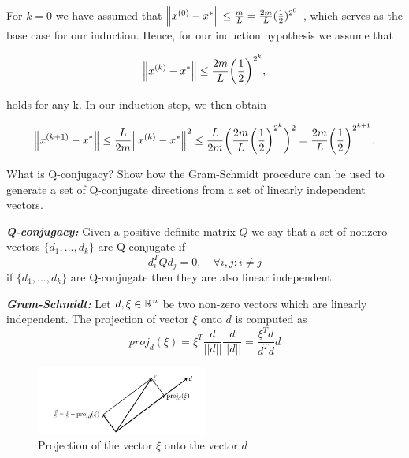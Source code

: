 \documentclass[12pt,a4paper]{article}
\begin{document}
For $k = 0$ we have assumed that $\norm{x^{(0)} - x^*} \leq \frac{m}{L}=\frac{2m}{L}(\frac{1}{2})^{2^0}$ , which serves as the base case for
our induction. Hence, for our induction hypothesis we assume that

\begin{align*}
    \norm{\kth{x} -x^*} \leq \frac{2m}{L}\biggl(\frac{1}{2}\biggr)^{2^k},
\end{align*}

holds for any k. In our induction step, we then obtain

\begin{equation*}\begin{aligned}
    \norm{\kth[k+1]{x} -x^*} \leq \frac{L}{2m} \norm{\kth{x}-x^*}^2 \leq \frac{L}{2m} \biggl(\frac{2m}{L} \biggl(\frac{1}{2}\biggr)^{2^k}\biggr)^2=\frac{2m}{L}\biggl(\frac{1}{2}\biggr)^{2^{k+1}}.
\end{aligned}\end{equation*}


\begin{question}
What is Q-conjugacy? Show how the Gram-Schmidt procedure can be
used to generate a set of Q-conjugate directions from a set of linearly
independent vectors.
\end{question}


	\textbf{\textit{Q-conjugacy:}}
		Given a positive definite matrix $Q$ we say that a set of nonzero vectors $\{d_1,...,d_k\}$ are Q-conjugate if
		$$ d_i^T Q d_j = 0, \quad \forall i,j : i \neq j$$
		if $\{d_1,...,d_k\}$ are Q-conjugate then they are also linear independent.
	
	\textbf{\textit{Gram-Schmidt:}}
		Let $d,\xi \in \RR^n$ be two non-zero vectors which are linearly independent. The projection of vector $\xi$ onto $d$ is computed as
		$$ proj_d(\xi) = \xi^T \frac{d}{||d||}\frac{d}{||d||} = \frac{\xi^T d}{d^Td}d$$
		
		\begin{figure}
			\centering
			\includegraphics[width=0.5\textwidth]{figures/proj.jpg}
			\caption{Projection of the vector $\xi$ onto the vector $d$}
		\end{figure}
		
\end{document}

